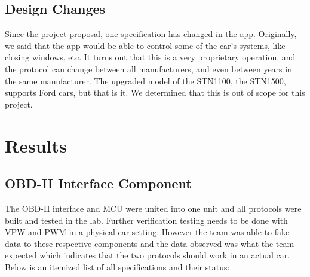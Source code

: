\documentclass[12pt,letterpaper]{article}
\begin{document}
\subsection{Design Changes}
Since the project proposal, one specification has changed in the app. Originally, we said that the app would be able to control some of the car's systems, like closing windows, etc. It turns out that this is a very proprietary operation, and the protocol can change between all manufacturers, and even between years in the same manufacturer. The upgraded model of the STN1100, the STN1500, supports Ford cars, but that is it. We determined that this is out of scope for this project.

\newpage

\section{Results}
\subsection{OBD-II Interface Component}
The OBD-II interface and MCU were united into one unit and all protocols were built and tested in the lab. Further verification testing needs to be done with VPW and PWM in a physical car setting. However the team was able to fake data to these respective components and the data observed was what the team expected which indicates that the two protocols should work in an actual car. Below is an itemized list of all specifications and their status:
\end{document}
